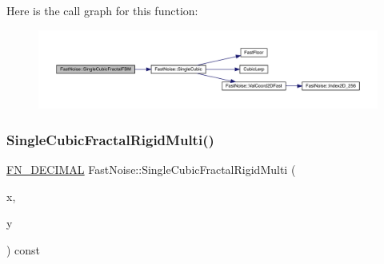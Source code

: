 Here is the call graph for this function\+:
\nopagebreak
\begin{figure}[H]
\begin{center}
\leavevmode
\includegraphics[width=350pt]{class_fast_noise_a6334e559478fb891e31e305d64c0c31d_cgraph}
\end{center}
\end{figure}
\mbox{\label{class_fast_noise_ae8f66a142a0206d4907a5dab291f4b3d}} 
\subsubsection{\texorpdfstring{Single\+Cubic\+Fractal\+Rigid\+Multi()}{SingleCubicFractalRigidMulti()}\hspace{0.1cm}{\footnotesize\ttfamily [1/2]}}
{\footnotesize\ttfamily \mbox{\hyperlink{_fast_noise_8h_a75a9ef6d2541c4921815b885bfd449c3}{F\+N\+\_\+\+D\+E\+C\+I\+M\+AL}} Fast\+Noise\+::\+Single\+Cubic\+Fractal\+Rigid\+Multi (\begin{DoxyParamCaption}\item[{\mbox{\hyperlink{_fast_noise_8h_a75a9ef6d2541c4921815b885bfd449c3}{F\+N\+\_\+\+D\+E\+C\+I\+M\+AL}}}]{x,  }\item[{\mbox{\hyperlink{_fast_noise_8h_a75a9ef6d2541c4921815b885bfd449c3}{F\+N\+\_\+\+D\+E\+C\+I\+M\+AL}}}]{y }\end{DoxyParamCaption}) const\hspace{0.3cm}{\ttfamily [private]}}

